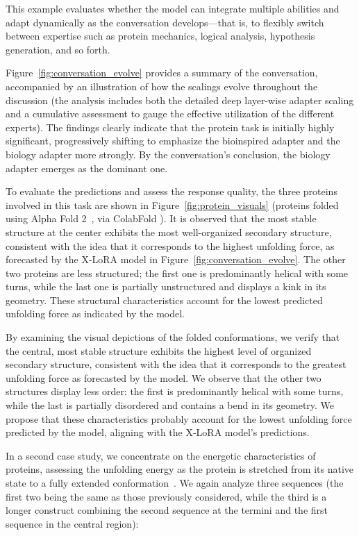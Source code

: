 This example evaluates whether the model can integrate multiple abilities and adapt dynamically as the conversation develops—that is, to flexibly switch between expertise such as protein mechanics, logical analysis, hypothesis generation, and so forth.

Figure~\ref{fig:conversation_evolve} provides a summary of the conversation, accompanied by an illustration of how the scalings evolve throughout the discussion (the analysis includes both the detailed deep layer-wise adapter scaling and a cumulative assessment to gauge the effective utilization of the different experts). The findings clearly indicate that the protein task is initially highly significant, progressively shifting to emphasize the bioinspired adapter and the biology adapter more strongly. By the conversation's conclusion, the biology adapter emerges as the dominant one.

To evaluate the predictions and assess the response quality, the three proteins involved in this task are shown in Figure~\ref{fig:protein_visuals} (proteins folded using Alpha Fold 2~\cite{Jumper2021HighlyAlphaFoldb}, via ColabFold \cite{Mirdita2022ColabFold:All}). It is observed that the most stable structure at the center exhibits the most well-organized secondary structure, consistent with the idea that it corresponds to the highest unfolding force, as forecasted by the X-LoRA model in Figure~\ref{fig:conversation_evolve}. The other two proteins are less structured; the first one is predominantly helical with some turns, while the last one is partially unstructured and displays a kink in its geometry. These structural characteristics account for the lowest predicted unfolding force as indicated by the model.

By examining the visual depictions of the folded conformations, we verify that the central, most stable structure exhibits the highest level of organized secondary structure, consistent with the idea that it corresponds to the greatest unfolding force as forecasted by the model. We observe that the other two structures display less order: the first is predominantly helical with some turns, while the last is partially disordered and contains a bend in its geometry. We propose that these characteristics probably account for the lowest unfolding force predicted by the model, aligning with the X-LoRA model's predictions.

In a second case study, we concentrate on the energetic characteristics of proteins, assessing the unfolding energy as the protein is stretched from its native state to a fully extended conformation~\cite{Ni2023ForceGen:Model}. We again analyze three sequences (the first two being the same as those previously considered, while the third is a longer construct combining the second sequence at the termini and the first sequence in the central region):

